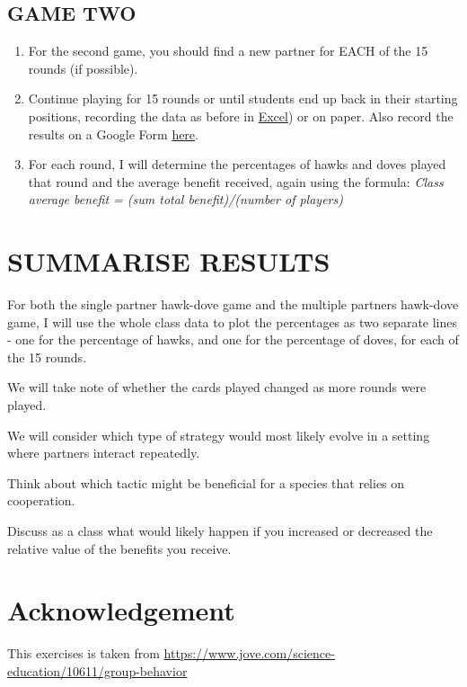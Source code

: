 \documentclass[
  a4paper]{book}
\begin{document}
\subsection{GAME TWO}\label{game-two}

\begin{enumerate}
\def\labelenumi{\arabic{enumi}.}
\item
  For the second game, you should find a new partner for EACH of the 15 rounds (if possible).
\item
  Continue playing for 15 rounds or until students end up back in their starting positions, recording the data as before in \href{https://www.dropbox.com/s/3tjkck3kmpek6xc/Table_3_Group_behavior.xlsx?dl=1}{Excel}) or on paper. Also record the results on a Google Form \href{https://forms.gle/F9YhYcTWRvoF4djt7}{here}.
\item
  For each round, I will determine the percentages of hawks and doves played that round and the average benefit received, again using the formula: \emph{Class average benefit = (sum total benefit)/(number of players)}
\end{enumerate}

\section{SUMMARISE RESULTS}\label{summarise-results}

For both the single partner hawk-dove game and the multiple partners hawk-dove game, I will use the whole class data to plot the percentages as two separate lines - one for the percentage of hawks, and one for the percentage of doves, for each of the 15 rounds.

We will take note of whether the cards played changed as more rounds were played.

We will consider which type of strategy would most likely evolve in a setting where partners interact repeatedly.

Think about which tactic might be beneficial for a species that relies on cooperation.

Discuss as a class what would likely happen if you increased or decreased the relative value of the benefits you receive.

\section{Acknowledgement}\label{acknowledgement}

This exercises is taken from \url{https://www.jove.com/science-education/10611/group-behavior}
\end{document}
